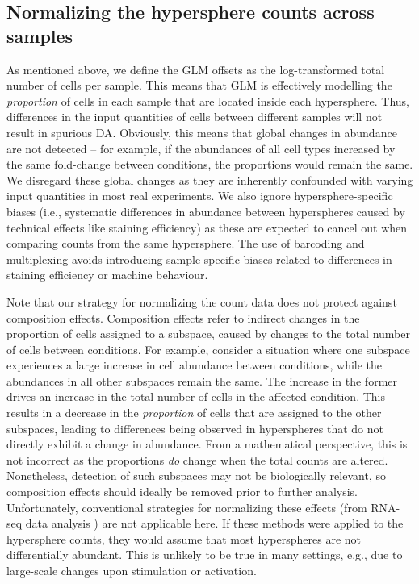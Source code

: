 \documentclass{article}
\begin{document}
\subsection{Normalizing the hypersphere counts across samples}
As mentioned above, we define the GLM offsets as the log-transformed total number of cells per sample.
This means that GLM is effectively modelling the \textit{proportion} of cells in each sample that are located inside each hypersphere.
Thus, differences in the input quantities of cells between different samples will not result in spurious DA.
Obviously, this means that global changes in abundance are not detected -- for example, if the abundances of all cell types increased by the same fold-change between conditions, the proportions would remain the same.
We disregard these global changes as they are inherently confounded with varying input quantities in most real experiments.
We also ignore hypersphere-specific biases (i.e., systematic differences in abundance between hyperspheres caused by technical effects like staining efficiency) as these are expected to cancel out when comparing counts from the same hypersphere.
The use of barcoding and multiplexing avoids introducing sample-specific biases related to differences in staining efficiency or machine behaviour.


Note that our strategy for normalizing the count data does not protect against composition effects.
Composition effects refer to indirect changes in the proportion of cells assigned to a subspace, caused by changes to the total number of cells between conditions.
For example, consider a situation where one subspace experiences a large increase in cell abundance between conditions, while the abundances in all other subspaces remain the same.
The increase in the former drives an increase in the total number of cells in the affected condition.
This results in a decrease in the \textit{proportion} of cells that are assigned to the other subspaces, leading to differences being observed in hyperspheres that do not directly exhibit a change in abundance.
From a mathematical perspective, this is not incorrect as the proportions \textit{do} change when the total counts are altered.
Nonetheless, detection of such subspaces may not be biologically relevant, so composition effects should ideally be removed prior to further analysis.
Unfortunately, conventional strategies for normalizing these effects (from RNA-seq data analysis \cite{robinson2010scaling}) are not applicable here.
If these methods were applied to the hypersphere counts, they would assume that most hyperspheres are not differentially abundant.
This is unlikely to be true in many settings, e.g., due to large-scale changes upon stimulation or activation.
\end{document}
